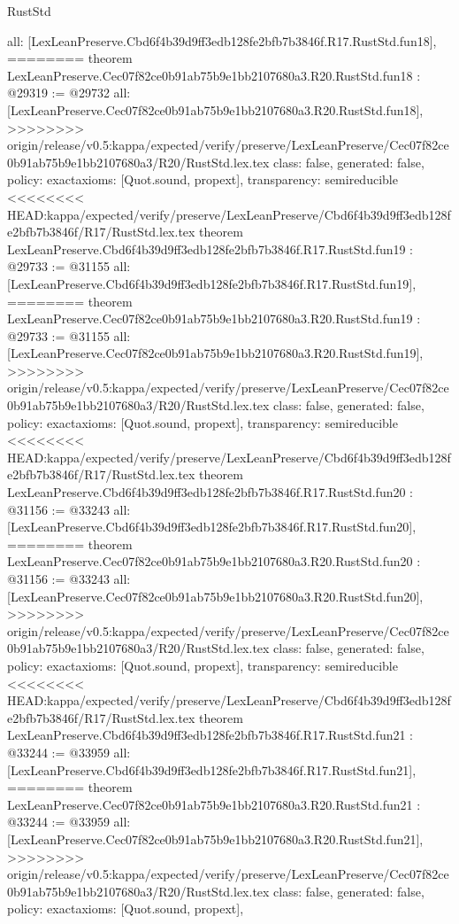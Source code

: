 \begin{lexlean}{RustStd}
\begin{coremodule}
{\begin{coremodule}
{{{{{{{{{{{{{{{{{{{{{  all: [LexLeanPreserve.Cbd6f4b39d9ff3edb128fe2bfb7b3846f.R17.RustStd.fun18],
========
theorem LexLeanPreserve.Cec07f82ce0b91ab75b9e1bb2107680a3.R20.RustStd.fun18 : @29319 := @29732 {
  all: [LexLeanPreserve.Cec07f82ce0b91ab75b9e1bb2107680a3.R20.RustStd.fun18],
>>>>>>>> origin/release/v0.5:kappa/expected/verify/preserve/LexLeanPreserve/Cec07f82ce0b91ab75b9e1bb2107680a3/R20/RustStd.lex.tex
  class: false,
  generated: false,
  policy: exact{axioms: [Quot.sound, propext]},
  transparency: semireducible
}
<<<<<<<< HEAD:kappa/expected/verify/preserve/LexLeanPreserve/Cbd6f4b39d9ff3edb128fe2bfb7b3846f/R17/RustStd.lex.tex
theorem LexLeanPreserve.Cbd6f4b39d9ff3edb128fe2bfb7b3846f.R17.RustStd.fun19 : @29733 := @31155 {
  all: [LexLeanPreserve.Cbd6f4b39d9ff3edb128fe2bfb7b3846f.R17.RustStd.fun19],
========
theorem LexLeanPreserve.Cec07f82ce0b91ab75b9e1bb2107680a3.R20.RustStd.fun19 : @29733 := @31155 {
  all: [LexLeanPreserve.Cec07f82ce0b91ab75b9e1bb2107680a3.R20.RustStd.fun19],
>>>>>>>> origin/release/v0.5:kappa/expected/verify/preserve/LexLeanPreserve/Cec07f82ce0b91ab75b9e1bb2107680a3/R20/RustStd.lex.tex
  class: false,
  generated: false,
  policy: exact{axioms: [Quot.sound, propext]},
  transparency: semireducible
}
<<<<<<<< HEAD:kappa/expected/verify/preserve/LexLeanPreserve/Cbd6f4b39d9ff3edb128fe2bfb7b3846f/R17/RustStd.lex.tex
theorem LexLeanPreserve.Cbd6f4b39d9ff3edb128fe2bfb7b3846f.R17.RustStd.fun20 : @31156 := @33243 {
  all: [LexLeanPreserve.Cbd6f4b39d9ff3edb128fe2bfb7b3846f.R17.RustStd.fun20],
========
theorem LexLeanPreserve.Cec07f82ce0b91ab75b9e1bb2107680a3.R20.RustStd.fun20 : @31156 := @33243 {
  all: [LexLeanPreserve.Cec07f82ce0b91ab75b9e1bb2107680a3.R20.RustStd.fun20],
>>>>>>>> origin/release/v0.5:kappa/expected/verify/preserve/LexLeanPreserve/Cec07f82ce0b91ab75b9e1bb2107680a3/R20/RustStd.lex.tex
  class: false,
  generated: false,
  policy: exact{axioms: [Quot.sound, propext]},
  transparency: semireducible
}
<<<<<<<< HEAD:kappa/expected/verify/preserve/LexLeanPreserve/Cbd6f4b39d9ff3edb128fe2bfb7b3846f/R17/RustStd.lex.tex
theorem LexLeanPreserve.Cbd6f4b39d9ff3edb128fe2bfb7b3846f.R17.RustStd.fun21 : @33244 := @33959 {
  all: [LexLeanPreserve.Cbd6f4b39d9ff3edb128fe2bfb7b3846f.R17.RustStd.fun21],
========
theorem LexLeanPreserve.Cec07f82ce0b91ab75b9e1bb2107680a3.R20.RustStd.fun21 : @33244 := @33959 {
  all: [LexLeanPreserve.Cec07f82ce0b91ab75b9e1bb2107680a3.R20.RustStd.fun21],
>>>>>>>> origin/release/v0.5:kappa/expected/verify/preserve/LexLeanPreserve/Cec07f82ce0b91ab75b9e1bb2107680a3/R20/RustStd.lex.tex
  class: false,
  generated: false,
  policy: exact{axioms: [Quot.sound, propext]},
}}}}}}}}}}}}}}}}}}}}}}}}}
\end{coremodule}}
\end{coremodule}
\end{lexlean}
